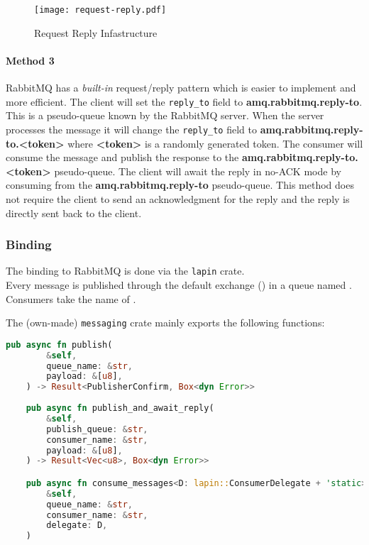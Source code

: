 \documentclass[../documentation.tex]{subfiles}
\begin{document}
\begin{figure}[h]
    \centering
    \texttt{[image: request-reply.pdf]}
    \caption{Request Reply Infastructure}
\end{figure}

\paragraph{Method 3} RabbitMQ has a \textit{built-in} request/reply pattern which is easier to implement and more efficient.
The client will set the \texttt{reply\_to} field to \textbf{amq.rabbitmq.reply-to}.
This is a pseudo-queue known by the RabbitMQ server. When the server processes the message it will change
the \texttt{reply\_to} field to \textbf{amq.rabbitmq.reply-to.<token>} where \textbf{<token>} is a randomly generated
token. The consumer will consume the message and publish the response to the \textbf{amq.rabbitmq.reply-to.<token>}
pseudo-queue. The client will await the reply in no-ACK mode by consuming from the \textbf{amq.rabbitmq.reply-to} pseudo-queue.
This method does not require the client to send an acknowledgment for the reply and the reply is directly sent back to the client.

\pagebreak

\subsubsection{Binding}

The binding to RabbitMQ is done via the \texttt{lapin} crate. \\
Every message is published through the default exchange (\quotes{})
in a queue named . Consumers take the name of .

The (own-made) \texttt{messaging} crate mainly exports the following functions:

\begin{lstlisting}[language=Rust, style=boxed, numbers=none]
    pub async fn publish(
        &self,
        queue_name: &str,
        payload: &[u8],
    ) -> Result<PublisherConfirm, Box<dyn Error>>
    
    pub async fn publish_and_await_reply(
        &self,
        publish_queue: &str,
        consumer_name: &str,
        payload: &[u8],
    ) -> Result<Vec<u8>, Box<dyn Error>>

    pub async fn consume_messages<D: lapin::ConsumerDelegate + 'static>(
        &self,
        queue_name: &str,
        consumer_name: &str,
        delegate: D,
    )
\end{lstlisting}
\end{document}
